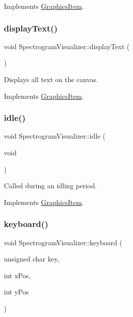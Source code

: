Implements \hyperlink{classGraphicsItem}{Graphics\+Item}.

\hypertarget{structSpectrogramVisualizer_a9b9aa780d95f710b1c876ce49abac9a1}{}\label{structSpectrogramVisualizer_a9b9aa780d95f710b1c876ce49abac9a1} 
\subsubsection{\texorpdfstring{display\+Text()}{displayText()}}
{\ttfamily void Spectrogram\+Visualizer\+::display\+Text (\begin{DoxyParamCaption}{ }\end{DoxyParamCaption})\hspace{0.3cm}{\ttfamily [virtual]}}

Displays all text on the canvas. 

Implements \hyperlink{classGraphicsItem}{Graphics\+Item}.

\hypertarget{structSpectrogramVisualizer_a669c19fe9dc24dc89e1cc518edb24de6}{}\label{structSpectrogramVisualizer_a669c19fe9dc24dc89e1cc518edb24de6} 
\subsubsection{\texorpdfstring{idle()}{idle()}}
{\ttfamily void Spectrogram\+Visualizer\+::idle (\begin{DoxyParamCaption}\item[{void}]{ }\end{DoxyParamCaption})\hspace{0.3cm}{\ttfamily [virtual]}}

Called during an idling period. 

Implements \hyperlink{classGraphicsItem}{Graphics\+Item}.

\hypertarget{structSpectrogramVisualizer_a2901f4ea1e35d4c7e6660f6c19ed468f}{}\label{structSpectrogramVisualizer_a2901f4ea1e35d4c7e6660f6c19ed468f} 
\subsubsection{\texorpdfstring{keyboard()}{keyboard()}}
{\ttfamily void Spectrogram\+Visualizer\+::keyboard (\begin{DoxyParamCaption}\item[{unsigned char}]{key,  }\item[{int}]{x\+Pos,  }\item[{int}]{y\+Pos }\end{DoxyParamCaption})\hspace{0.3cm}{\ttfamily [virtual]}}

